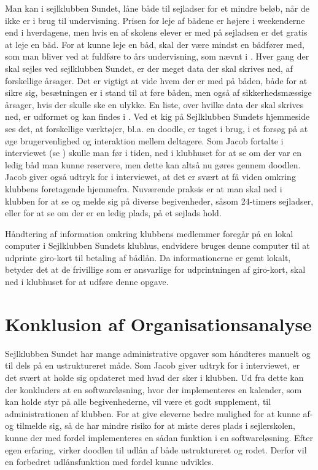 Man kan i sejlklubben Sundet, låne både til sejladser for et mindre beløb, når de ikke er i brug til undervisning.
Prisen for leje af bådene er højere i weekenderne end i hverdagene, men hvis en af skolens elever er med på sejladsen er
det gratis at leje en båd. For at kunne leje en båd, skal der være mindst en bådfører med, som man bliver ved at
fuldføre to års undervisning, som nævnt i  \citep{Sundet}. Hver gang der skal sejles ved
sejlklubben Sundet, er der meget data der skal skrives ned, af forskellige årsager. Det er vigtigt at vide hvem der er
med på båden, både for at sikre sig, besætningen er i stand til at føre båden, men også af sikkerhedsmæssige årsager,
hvis der skulle ske en ulykke. En liste, over hvilke data der skal skrives ned, er udformet og kan findes i
. Ved et kig på Sejlklubben Sundets hjemmeside \citep{SundetUdlaan} ses det, at forskellige
værktøjer, bl.a. en doodle, er taget i brug, i et forsøg på at øge brugervenlighed og interaktion mellem deltagere. 
Som Jacob fortalte i interviewet (se ) skulle man før i tiden, ned i klubhuset for at se om der var
en ledig båd man kunne reservere, men dette kan altså nu gøres gennem doodlen. Jacob giver også udtryk for i
interviewet, at det er svært at få viden omkring klubbens foretagende hjemmefra. Nuværende praksis er at man skal ned i
klubben for at se og melde sig på diverse begivenheder, såsom 24-timers sejladser, eller for at se om der er en ledig
plads, på et sejlads hold.

Håndtering af information omkring klubbens medlemmer foregår på en lokal computer i Sejlklubben Sundets klubhus,
endvidere bruges denne computer til at udprinte giro-kort til betaling af bådlån. Da informationerne er gemt lokalt,
betyder det at de frivillige som er ansvarlige for udprintningen af giro-kort, skal ned i klubhuset for at udføre denne
opgave.


\section{Konklusion af Organisationsanalyse}

Sejlklubben Sundet har mange administrative opgaver som håndteres manuelt og til dels på en ustruktureret måde. Som
Jacob giver udtryk for i interviewet, er det svært at holde sig opdateret med hvad der sker i klubben. Ud fra dette kan
der konkluders at en softwareløsning, hvor der implementeres en kalender, som kan holde styr på alle begivenhederne, vil
være et godt supplement, til administrationen af klubben. For at give eleverne bedre mulighed for at kunne af- og
tilmelde sig, så de har mindre risiko for at miste deres plads i sejlerskolen, kunne der med fordel implementeres en
sådan funktion i en softwareløsning. Efter egen erfaring, virker doodlen til udlån af både ustruktureret og rodet.
Derfor vil en forbedret udlånsfunktion med fordel kunne udvikles.

